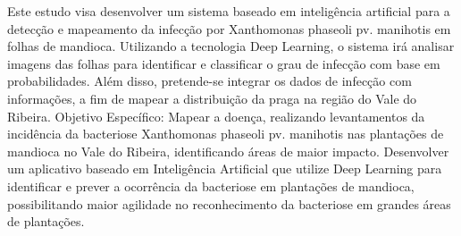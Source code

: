 Este estudo visa desenvolver um sistema baseado em inteligência artificial para a detecção e mapeamento da infecção por Xanthomonas phaseoli pv. manihotis em folhas de mandioca. Utilizando a tecnologia Deep Learning, o sistema irá analisar imagens das folhas para identificar e classificar o grau de infecção com base em probabilidades. Além disso, pretende-se integrar os dados de infecção com informações, a fim de mapear a distribuição da praga na região do Vale do Ribeira.
Objetivo Específico:
Mapear a doença, realizando levantamentos da incidência da bacteriose Xanthomonas phaseoli pv. manihotis nas plantações de mandioca no Vale do Ribeira, identificando áreas de maior impacto.
Desenvolver um aplicativo baseado em Inteligência Artificial que utilize Deep Learning para identificar e prever a ocorrência da bacteriose em plantações de mandioca, possibilitando maior agilidade no reconhecimento da bacteriose em grandes áreas de plantações.



